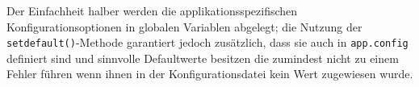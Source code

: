 Der Einfachheit halber werden die applikationsspezifischen Konfigurationsoptionen in globalen
Variablen abgelegt; die Nutzung der \lstinline{setdefault()}-Methode garantiert jedoch zusätzlich,
dass sie auch in \lstinline{app.config} definiert sind und sinnvolle Defaultwerte besitzen die
zumindest nicht zu einem Fehler führen wenn ihnen in der Konfigurationsdatei kein Wert zugewiesen
wurde.
